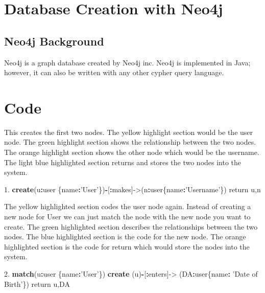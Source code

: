 \documentclass[]{book}
\newenvironment{Shaded}{\begin{snugshade}}{\end{snugshade}}
\newcommand{\KeywordTok}[1]{\textcolor[rgb]{0.13,0.29,0.53}{\textbf{#1}}}
\newcommand{\FloatTok}[1]{\textcolor[rgb]{0.00,0.00,0.81}{#1}}
\newcommand{\StringTok}[1]{\textcolor[rgb]{0.31,0.60,0.02}{#1}}
\newcommand{\OperatorTok}[1]{\textcolor[rgb]{0.81,0.36,0.00}{\textbf{#1}}}
\newcommand{\NormalTok}[1]{#1}
\begin{document}
\section{Database Creation with
Neo4j}\label{database-creation-with-neo4j}

\subsection{Neo4j Background}\label{neo4j-background}

Neo4j is a graph database created by Neo4j inc. Neo4j is implemented in
Java; however, it can also be written with any other cypher query
language.

\section{Code}\label{code-1}

This creates the first two nodes. The yellow highlight section would be
the user node. The green highlight section shows the relationship
between the two nodes. The orange highlight section shows the other node
which would be the username. The light blue highlighted section returns
and stores the two nodes into the system.

\begin{Shaded}
\begin{Highlighting}[]
\FloatTok{1.} \KeywordTok{create}\NormalTok{(u}\OperatorTok{:}\NormalTok{user \{name}\OperatorTok{:}\StringTok{'User'}\NormalTok{\})}\OperatorTok{-}\NormalTok{[}\OperatorTok{:}\NormalTok{makes]->(n}\OperatorTok{:}\NormalTok{user\{name}\OperatorTok{:}\StringTok{'Username'}\NormalTok{\}) return u,n}
\end{Highlighting}
\end{Shaded}

The yellow highlighted section codes the user node again. Instead of
creating a new node for User we can just match the node with the new
node you want to create. The green highlighted section describes the
relationships between the two nodes. The blue highlighted section is the
code for the new node. The orange highlighted section is the code for
return which would store the nodes into the system.

\begin{Shaded}
\begin{Highlighting}[]
\FloatTok{2.} \KeywordTok{match}\NormalTok{(u}\OperatorTok{:}\NormalTok{user \{name}\OperatorTok{:}\StringTok{'User'}\NormalTok{\}) }\KeywordTok{create}\NormalTok{ (u)}\OperatorTok{-}\NormalTok{[}\OperatorTok{:}\NormalTok{enters]->}\StringTok{ }\NormalTok{(DA}\OperatorTok{:}\NormalTok{user\{name}\OperatorTok{:}\StringTok{ 'Date of Birth'}\NormalTok{\}) return u,DA}
\end{Highlighting}
\end{Shaded}
\end{document}
